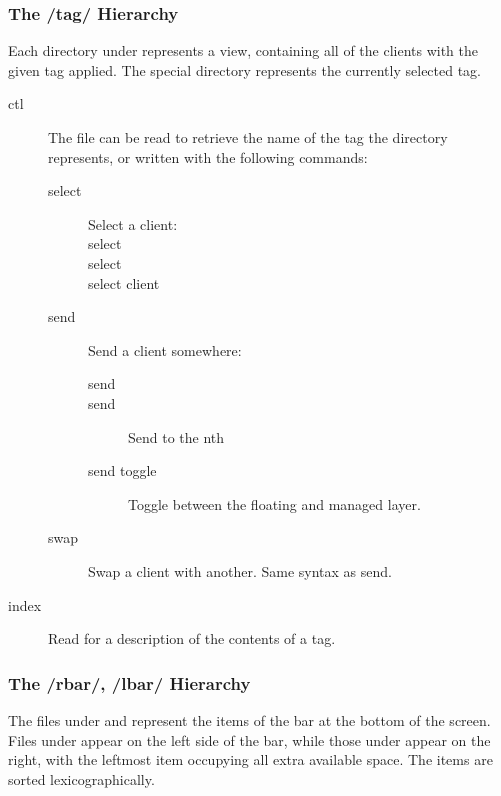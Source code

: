 \subsubsection{The /tag/ Hierarchy}

Each directory under  represents a view, containing
all of the clients with the given tag applied. The special
 directory represents the currently selected tag.

\begin{description}
\item[ctl] The  file can be read to retrieve the name
	of the tag the directory represents, or written with the
	following commands:
	\begin{description}
	\item[select] Select a client: \\
		\SP\SP select  \\
		\SP\SP select   \\
		\SP\SP select client 
	\item[send] Send a client somewhere:
		\begin{description}
		\item[send  ]
		\item[send  ] Send
			 to the nth 
		\item[send  toggle] Toggle
			 between the floating and
			managed layer.
		\end{description}
	\item[swap] Swap a client with another. Same syntax as
		send.
	\end{description}
\item[index] Read for a description of the contents of a tag.
\end{description}

\subsubsection{The /rbar/, /lbar/ Hierarchy}

The files under  and  represent the
items of the bar at the bottom of the screen. Files under
 appear on the left side of the bar, while those
under  appear on the right, with the leftmost item
occupying all extra available space. The items are sorted
lexicographically.


